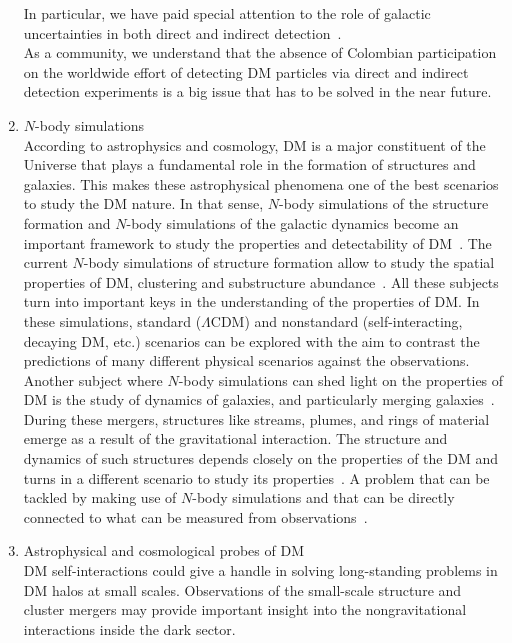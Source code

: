 \documentclass[a4paper,11pt]{article}
\begin{document}
\begin{enumerate}
In particular, we have paid special attention to the role of galactic uncertainties in both direct and indirect detection~\cite{Bernal:2014mmt, Bernal:2016guq, Benito:2016kyp}.\\
As a community, we understand that the absence of Colombian participation on the worldwide effort of detecting DM particles via direct and indirect detection experiments is a big issue that has to be solved in the near future.
%
\item
$N$-body simulations\\ 
According to astrophysics and cosmology, DM is a major constituent of the Universe that plays a fundamental role in the formation of structures and galaxies. This makes these astrophysical phenomena one of the best scenarios to study the DM nature. In that sense, $N$-body simulations of the structure formation and $N$-body simulations of the galactic dynamics become an important framework to study the properties and detectability of DM~\cite{Munoz-Cuartas2011, Maccio2013}.
The current $N$-body simulations of structure formation allow to study the spatial properties of DM, clustering and substructure abundance~\cite{Munoz-Cuartas2011b, Munoz-Cuartas2012}. All these subjects turn into important keys in the understanding of the properties of DM. In these simulations, standard ($\Lambda$CDM) and nonstandard (self-interacting, decaying DM, etc.) scenarios can be explored with the aim to contrast the predictions of many different physical scenarios against the observations.
Another subject where $N$-body simulations can shed light on the properties of DM is the study of dynamics of galaxies, and particularly merging galaxies~\cite{Norena_etal2019, Quiroga2020}. During these mergers, structures like streams, plumes, and rings of material emerge as a result of the gravitational interaction. The structure and dynamics of such structures depends closely on the properties of the DM and turns in a different scenario to study its properties~\cite{Quiroga2020}. A problem that can be tackled by making use of $N$-body simulations and that can be directly connected to what can be measured from observations~\cite{Bernal:2014mmt, Bernal:2016guq}.  
%
\item
Astrophysical and cosmological probes of DM\\
DM self-interactions could give a handle in solving long-standing problems in DM halos at small scales. Observations of the small-scale structure and cluster mergers may provide important insight into the nongravitational interactions inside the dark sector.

\end{enumerate}
\end{document}
